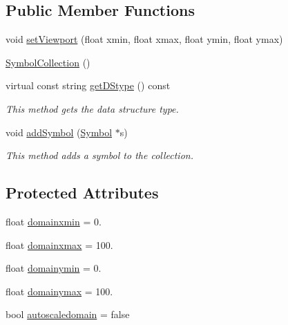 \subsection*{Public Member Functions}
\begin{DoxyCompactItemize}
\item 
void \hyperlink{classbridges_1_1datastructure_1_1_symbol_collection_a8853f758e4e8ab7f9cef5bf4d0494027}{set\+Viewport} (float xmin, float xmax, float ymin, float ymax)
\item 
\hyperlink{classbridges_1_1datastructure_1_1_symbol_collection_aa8d074ecf235848f4253b19d6f5c7c74}{Symbol\+Collection} ()
\item 
virtual const string \hyperlink{classbridges_1_1datastructure_1_1_symbol_collection_a8f63c31a48a12127978967b706fc38f5}{get\+D\+Stype} () const
\begin{DoxyCompactList}\small\item\em This method gets the data structure type. \end{DoxyCompactList}\item 
void \hyperlink{classbridges_1_1datastructure_1_1_symbol_collection_aa569dc59920bf4cad706f44cd8492d52}{add\+Symbol} (\hyperlink{classbridges_1_1datastructure_1_1_symbol}{Symbol} $\ast$s)
\begin{DoxyCompactList}\small\item\em This method adds a symbol to the collection. \end{DoxyCompactList}\end{DoxyCompactItemize}
\subsection*{Protected Attributes}
\begin{DoxyCompactItemize}
\item 
float \hyperlink{classbridges_1_1datastructure_1_1_symbol_collection_a3db2f9c5d239e4ca964ea017a2beedac}{domainxmin} = 0.
\item 
float \hyperlink{classbridges_1_1datastructure_1_1_symbol_collection_a424f539a0a7cc48735f58978bb37249b}{domainxmax} = 100.
\item 
float \hyperlink{classbridges_1_1datastructure_1_1_symbol_collection_a2f08353c46444762f329bec94f087a2b}{domainymin} = 0.
\item 
float \hyperlink{classbridges_1_1datastructure_1_1_symbol_collection_a62b61a0ec9546c68f31a324ff6e6b518}{domainymax} = 100.
\item 
bool \hyperlink{classbridges_1_1datastructure_1_1_symbol_collection_a27dc0406085568b06244bcc0f8957f68}{autoscaledomain} = false
\end{DoxyCompactItemize}



